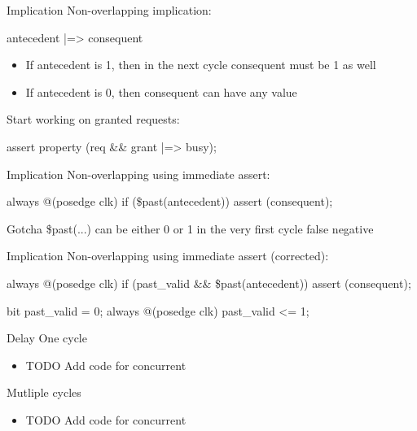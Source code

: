 \documentclass{beamer}
\begin{document}
\begin{frame}{Implication}
Non-overlapping implication:

\begin{semiverbatim}
antecedent |=> consequent
\end{semiverbatim}

\begin{itemize}
 \item If antecedent is 1, then in the next cycle consequent must be 1 as well
 \item If antecedent is 0, then consequent can have any value
\end{itemize}

\pause
Start working on granted requests:
\begin{semiverbatim}
assert property (req \&\& grant |=> busy);
\end{semiverbatim}
\end{frame}


\begin{frame}[fragile]{Implication}
Non-overlapping using immediate assert:

\begin{semiverbatim}
always @(posedge clk)
  if (\$past(antecedent))
    assert (consequent);
\end{semiverbatim}

\pause
\begin{alertblock}{Gotcha}
\$past(...) can be either 0 or 1 in the very first cycle \textrightarrow{} false negative
\end{alertblock}
\end{frame}


\begin{frame}[fragile]{Implication}
Non-overlapping using immediate assert (corrected):

\begin{semiverbatim}
always @(posedge clk)
  if (past_valid \&\& \$past(antecedent))
    assert (consequent);
\end{semiverbatim}

\begin{semiverbatim}
bit past_valid = 0;
always @(posedge clk)
  past_valid <= 1;
\end{semiverbatim}
\end{frame}


\begin{frame}{Delay}
One cycle

\begin{itemize}
 \item TODO Add code for concurrent
\end{itemize}

Mutliple cycles
\begin{itemize}
 \item TODO Add code for concurrent
\end{itemize}
\end{frame}
\end{document}
